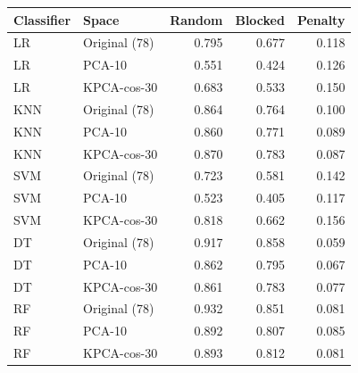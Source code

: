 \begin{tabular}{llrrr}
\toprule
Classifier & Space & Random & Blocked & Penalty \\
\midrule
LR & Original (78) & 0.795 & 0.677 & 0.118 \\
LR & PCA-10 & 0.551 & 0.424 & 0.126 \\
LR & KPCA-cos-30 & 0.683 & 0.533 & 0.150 \\
KNN & Original (78) & 0.864 & 0.764 & 0.100 \\
KNN & PCA-10 & 0.860 & 0.771 & 0.089 \\
KNN & KPCA-cos-30 & 0.870 & 0.783 & 0.087 \\
SVM & Original (78) & 0.723 & 0.581 & 0.142 \\
SVM & PCA-10 & 0.523 & 0.405 & 0.117 \\
SVM & KPCA-cos-30 & 0.818 & 0.662 & 0.156 \\
DT & Original (78) & 0.917 & 0.858 & 0.059 \\
DT & PCA-10 & 0.862 & 0.795 & 0.067 \\
DT & KPCA-cos-30 & 0.861 & 0.783 & 0.077 \\
RF & Original (78) & 0.932 & 0.851 & 0.081 \\
RF & PCA-10 & 0.892 & 0.807 & 0.085 \\
RF & KPCA-cos-30 & 0.893 & 0.812 & 0.081 \\
\bottomrule
\end{tabular}
